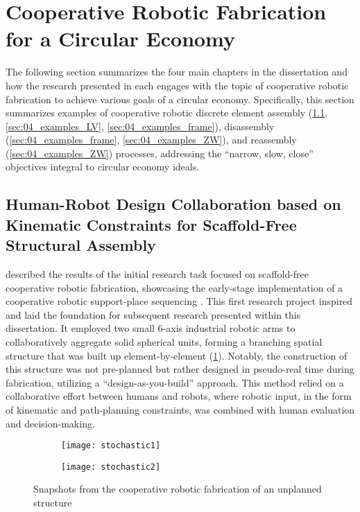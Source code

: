 \section{Cooperative Robotic Fabrication for a Circular Economy}\label{sec:04_examples}
    The following section summarizes the four main chapters in the dissertation and how the research presented in each engages with the topic of cooperative robotic fabrication to achieve various goals of a circular economy. Specifically, this section summarizes examples of cooperative robotic discrete element assembly (\cref{sec:04_examples_stochastic}, \cref{sec:04_examples_LV}, \cref{sec:04_examples_frame}), disassembly (\cref{sec:04_examples_frame}, \cref{sec:04_examples_ZW}), and reassembly (\cref{sec:04_examples_ZW}) processes, addressing the ``narrow, slow, close'' objectives integral to circular economy ideals.

\subsection{Human-Robot Design Collaboration based on Kinematic Constraints for Scaffold-Free Structural Assembly}\label{sec:04_examples_stochastic}
     described the results of the initial research task focused on scaffold-free cooperative robotic fabrication, showcasing the early-stage implementation of a cooperative robotic support-place sequencing \cite{bruun_humanrobot_2020}. This first research project inspired and laid the foundation for subsequent research presented within this dissertation. It employed two small 6-axis industrial robotic arms to collaboratively aggregate solid spherical units, forming a branching spatial structure that was built up element-by-element (\cref{fig:stochastic}). Notably, the construction of this structure was not pre-planned but rather designed in pseudo-real time during fabrication, utilizing a ``design-as-you-build'' approach. This method relied on a collaborative effort between humans and robots, where robotic input, in the form of kinematic and path-planning constraints, was combined with human evaluation and decision-making. 

        \begin{figure}[H]
        \centering
        \begin{subfigure}{.49\textwidth}
            \centering
            \texttt{[image: stochastic1]}
        \end{subfigure}
        \begin{subfigure}{.49\textwidth}
            \centering
            \texttt{[image: stochastic2]}
        \end{subfigure}
        \caption{Snapshots from the cooperative robotic fabrication of an unplanned structure}
        \label{fig:stochastic}
    \end{figure}  

